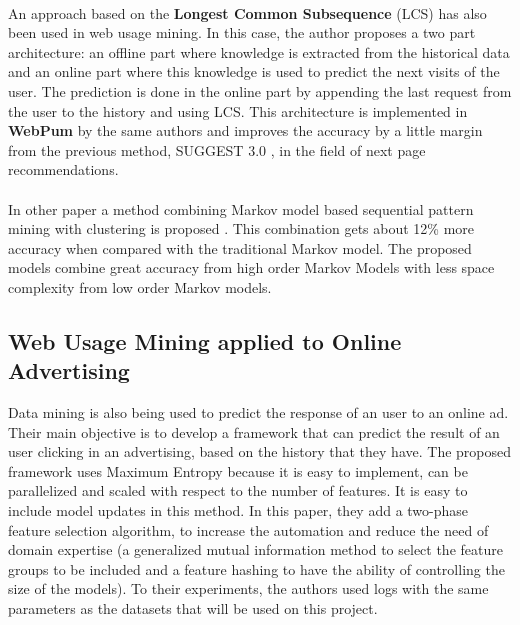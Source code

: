 \paragraph{}

An approach based on the \textbf{Longest Common Subsequence} (LCS)
\cite{4631852} has also been used in web usage mining. In this case, the author
proposes a two part architecture: an offline part where knowledge is extracted
from the historical data and an online part where this knowledge is used to
predict the next visits of the user. The prediction is done in the online part
by appending the last request from the user to the history and using LCS. This
architecture is implemented in \textbf{WebPum} \cite{Jalali20106201} by the same
authors and improves the accuracy by a little margin from the previous method,
SUGGEST 3.0 \cite{1410804}, in the field of next page recommendations.

\paragraph{}

In other paper a method combining Markov model based sequential pattern mining
with clustering is proposed \cite{Anitha_anew}. This combination gets about 12\%
more accuracy when compared with the traditional Markov model. The proposed
models combine great accuracy from high order Markov Models with less space
complexity from low order Markov models.

\subsection{Web Usage Mining applied to Online Advertising}

Data mining is also being used to predict the response of an user to an online
ad\cite{chapelle2013simple}. Their main objective is to develop a framework that
can predict the result of an user clicking in an advertising, based on the
history that they have. The proposed framework uses Maximum
Entropy\cite{Nigam99usingmaximum} because it is easy to implement, can be
parallelized and scaled with respect to the number of features. It is easy to
include model updates in this method. In this paper, they add a two-phase
feature selection algorithm, to increase the automation and reduce the need of
domain expertise (a generalized mutual information method to select the feature
groups to be included and a feature hashing to have the ability of controlling
the size of the models). To their experiments, the authors used logs with the
same parameters as the datasets that will be used on this project.

